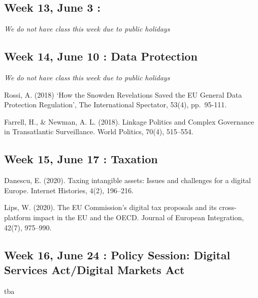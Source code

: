 \documentclass[12pt,]{article}
\begin{document}
\hypertarget{week-13-june-3}{%
\subsection{Week 13, June 3 :}\label{week-13-june-3}}

\emph{We do not have class this week due to public holidays}

\hypertarget{week-14-june-10-data-protection}{%
\subsection{Week 14, June 10 : Data
Protection}\label{week-14-june-10-data-protection}}

\emph{We do not have class this week due to public holidays}

Rossi, A. (2018) `How the Snowden Revelations Saved the EU General Data
Protection Regulation', The International Spectator, 53(4), pp.~95-111.

Farrell, H., \& Newman, A. L. (2018). Linkage Politics and Complex
Governance in Transatlantic Surveillance. World Politics, 70(4),
515--554.

\hypertarget{week-15-june-17-taxation}{%
\subsection{Week 15, June 17 :
Taxation}\label{week-15-june-17-taxation}}

Danescu, E. (2020). Taxing intangible assets: Issues and challenges for
a digital Europe. Internet Histories, 4(2), 196--216.

Lips, W. (2020). The EU Commission's digital tax proposals and its
cross-platform impact in the EU and the OECD. Journal of European
Integration, 42(7), 975--990.

\hypertarget{week-16-june-24-policy-session-digital-services-actdigital-markets-act}{%
\subsection{Week 16, June 24 : Policy Session: Digital Services
Act/Digital Markets
Act}\label{week-16-june-24-policy-session-digital-services-actdigital-markets-act}}

tba
\end{document}
